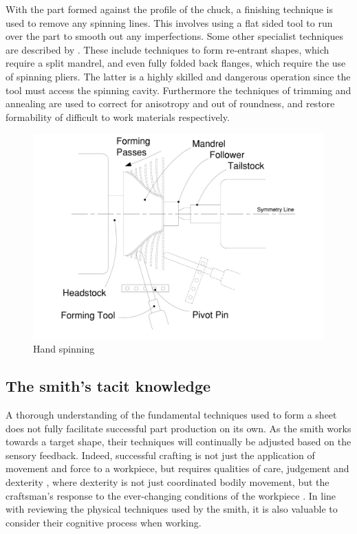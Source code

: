 With the part formed against the profile of the chuck, a finishing technique is used to remove any spinning lines.  This involves using a flat sided tool to run over the part to smooth out any imperfections.  Some other specialist techniques are described by \cite{Wiley2004TheHand-spinning}.  These include techniques to form re-entrant shapes, which require a split mandrel, and even fully folded back flanges, which require the use of spinning pliers. The latter is a highly skilled and dangerous operation since the tool must access the spinning cavity. Furthermore the techniques of trimming and annealing are used to correct for anisotropy and out of roundness, and restore formability of difficult to work materials respectively.  

\begin{figure}[tbh!]
    \centering
    \includegraphics[width=0.6\linewidth]{Images/Spinning.pdf}
    \caption{Hand spinning}
    \label{fig:SpinningTechDrawing}
\end{figure}


\subsection{The smith's tacit knowledge} \label{sec:tacitknowledge}

A thorough understanding of the fundamental techniques used to form a sheet does not fully facilitate successful part production on its own. As the smith works towards a target shape, their techniques will continually be adjusted based on the sensory feedback. Indeed, successful crafting is not just the application of movement and force to a workpiece, but requires qualities of care, judgement and dexterity \citep{Pye2008TheWorkmanship}, where dexterity is not just coordinated bodily movement, but the craftsman's response to the ever-changing conditions of the workpiece \citep{Ingold2001BeyondSkill}. In line with reviewing the physical techniques used by the smith, it is also valuable to consider their cognitive process when working.

